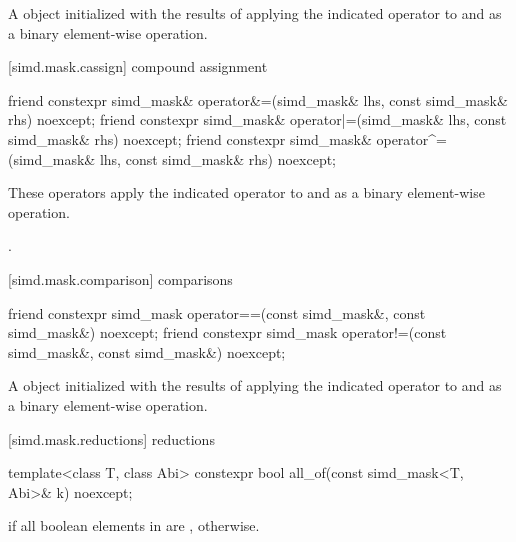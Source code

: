 \begin{itemdescr}
  \pnum\returns
  A  object initialized with the results of applying the indicated operator to  and  as a binary element-wise operation.
\end{itemdescr}

[simd.mask.cassign]{\texorpdfstring{ compound}{simd_mask compound} assignment}

\begin{itemdecl}
friend constexpr simd_mask& operator&=(simd_mask& lhs, const simd_mask& rhs) noexcept;
friend constexpr simd_mask& operator|=(simd_mask& lhs, const simd_mask& rhs) noexcept;
friend constexpr simd_mask& operator^=(simd_mask& lhs, const simd_mask& rhs) noexcept;
\end{itemdecl}

\begin{itemdescr}
  \pnum\effects
  These operators apply the indicated operator to  and  as a binary element-wise operation.

  \pnum\returns
  .
\end{itemdescr}

[simd.mask.comparison]{\texorpdfstring{ comparisons}{simd_mask comparisons}}

\begin{itemdecl}
friend constexpr simd_mask operator==(const simd_mask&, const simd_mask&) noexcept;
friend constexpr simd_mask operator!=(const simd_mask&, const simd_mask&) noexcept;
\end{itemdecl}

\begin{itemdescr}
  \pnum\returns
  A  object initialized with the results of applying the indicated operator to  and  as a binary element-wise operation.
\end{itemdescr}

[simd.mask.reductions]{\texorpdfstring{ reductions}{simd_mask reductions}}

\begin{itemdecl}
template<class T, class Abi> constexpr bool all_of(const simd_mask<T, Abi>& k) noexcept;
\end{itemdecl}

\begin{itemdescr}
  \pnum\returns
   if all boolean elements in  are ,  otherwise.
\end{itemdescr}

